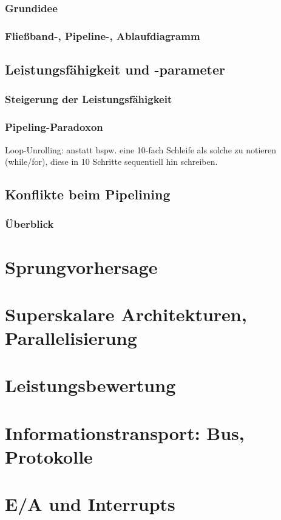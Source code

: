 \subsection{Grundidee}

\subsection{Fließband-, Pipeline-, Ablaufdiagramm}

\section{Leistungsfähigkeit und -parameter}
\subsection{Steigerung der Leistungsfähigkeit}
\subsection{Pipeling-Paradoxon}
Loop-Unrolling: anstatt bspw. eine 10-fach Schleife als solche zu notieren (while/for), diese in 10 Schritte sequentiell hin schreiben.

\section{Konflikte beim Pipelining}
\subsection{Überblick}


\chapter{Sprungvorhersage}

\chapter{Superskalare Architekturen, Parallelisierung}

\chapter{Leistungsbewertung}

\chapter{Informationstransport: Bus, Protokolle}

\chapter{E/A und Interrupts}

%



